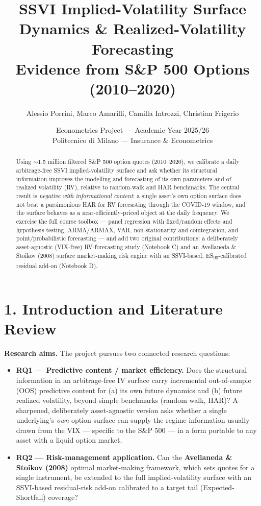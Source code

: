 \documentclass[10pt,a4paper]{article}
\title{SSVI Implied-Volatility Surface Dynamics \& Realized-Volatility Forecasting \\[2pt] \large Evidence from S\&P 500 Options (2010--2020)}
\author{Alessio Porrini, Marco Amarilli, Camilla Introzzi, Christian Frigerio}
\date{Econometrics Project --- Academic Year 2025/26 \\ Politecnico di Milano --- Insurance \& Econometrics}
\begin{document}
\maketitle
\vspace{-1.2em}
\begin{abstract}\noindent Using $\sim$1.5 million filtered S\&P 500 option quotes (2010--2020), we calibrate a daily arbitrage-free SSVI implied-volatility surface and ask whether its structural information improves the modelling and forecasting of its own parameters and of realized volatility (RV), relative to random-walk and HAR benchmarks. The central result is \textit{negative with informational content}: a single asset's own option surface does not beat a parsimonious HAR for RV forecasting through the COVID-19 window, and the surface behaves as a near-efficiently-priced object at the daily frequency. We exercise the full course toolbox --- panel regression with fixed/random effects and hypothesis testing, ARMA/ARMAX, VAR, non-stationarity and cointegration, and point/probabilistic forecasting --- and add two original contributions: a deliberately asset-agnostic (VIX-free) RV-forecasting study (Notebook C) and an Avellaneda \& Stoikov (2008) surface market-making risk engine with an SSVI-based, ES\textsubscript{95}-calibrated residual add-on (Notebook D). \end{abstract}


\section*{1. Introduction and Literature Review}

\textbf{Research aims.} The project pursues two connected research questions:

\begin{itemize}\setlength{\itemsep}{1pt}
\item \textbf{RQ1 --- Predictive content / market efficiency.} Does the structural information in an arbitrage-free IV surface carry incremental out-of-sample (OOS) predictive content for (a) its own future dynamics and (b) future realized volatility, beyond simple benchmarks (random walk, HAR)? A sharpened, deliberately asset-agnostic version asks whether a single underlying's \textit{own} option surface can supply the regime information usually drawn from the VIX --- specific to the S\&P 500 --- in a form portable to any asset with a liquid option market.
\item \textbf{RQ2 --- Risk-management application.} Can the \textbf{Avellaneda \& Stoikov (2008)} optimal market-making framework, which sets quotes for a single instrument, be extended to the full implied-volatility surface with an SSVI-based residual-risk add-on calibrated to a target tail (Expected-Shortfall) coverage?
\end{itemize}
\end{document}
